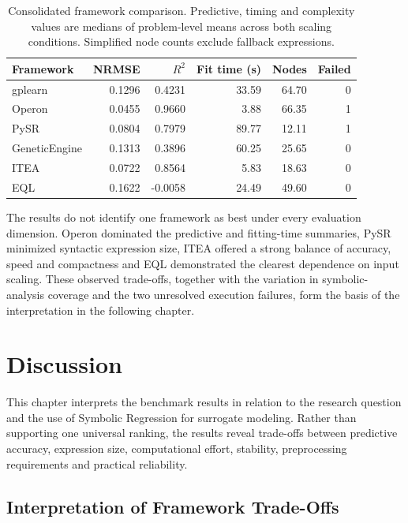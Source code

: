 \documentclass[12pt,oneside,bibtotoc,liststotoc]{scrbook}
\begin{document}
\begin{table}[H]
    \centering
    \caption{Consolidated framework comparison. Predictive, timing and complexity values are medians of problem-level means across both scaling conditions. Simplified node counts exclude fallback expressions.}
    \label{tab:results-consolidated}
    \begin{tabular}{lrrrrr}
        \toprule
        Framework & NRMSE & $R^2$ & Fit time (s) & Nodes & Failed \\
        \midrule
        gplearn & 0.1296 & 0.4231 & 33.59 & 64.70 & 0 \\
        Operon & 0.0455 & 0.9660 & 3.88 & 66.35 & 1 \\
        PySR & 0.0804 & 0.7979 & 89.77 & 12.11 & 1 \\
        GeneticEngine & 0.1313 & 0.3896 & 60.25 & 25.65 & 0 \\
        ITEA & 0.0722 & 0.8564 & 5.83 & 18.63 & 0 \\
        EQL & 0.1622 & -0.0058 & 24.49 & 49.60 & 0 \\
        \bottomrule
    \end{tabular}
\end{table}

The results do not identify one framework as best under every evaluation dimension. Operon dominated the predictive and fitting-time summaries, PySR minimized syntactic expression size, ITEA offered a strong balance of accuracy, speed and compactness and EQL demonstrated the clearest dependence on input scaling. These observed trade-offs, together with the variation in symbolic-analysis coverage and the two unresolved execution failures, form the basis of the interpretation in the following chapter.


\chapter{Discussion}

This chapter interprets the benchmark results in relation to the research question and the use of Symbolic Regression for surrogate modeling. Rather than supporting one universal ranking, the results reveal trade-offs between predictive accuracy, expression size, computational effort, stability, preprocessing requirements and practical reliability.

\section{Interpretation of Framework Trade-Offs}
\end{document}
